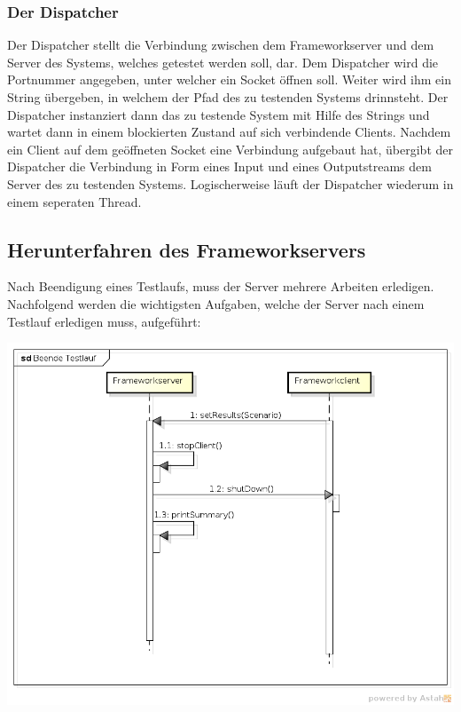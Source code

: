 \subsubsection{Der Dispatcher}
\label{sec:dispatcher}

Der Dispatcher stellt die Verbindung zwischen dem Frameworkserver und dem Server des Systems, welches getestet werden soll, dar. Dem Dispatcher wird die Portnummer angegeben, unter welcher ein Socket öffnen soll. Weiter wird ihm ein String übergeben, in welchem der Pfad des zu testenden Systems drinnsteht. Der Dispatcher instanziert dann das zu testende System mit Hilfe des Strings und wartet dann in einem blockierten Zustand auf sich verbindende Clients. Nachdem ein Client auf dem geöffneten Socket eine Verbindung aufgebaut hat, übergibt der Dispatcher die Verbindung in Form eines Input und eines Outputstreams dem Server des zu testenden Systems.\newline
Logischerweise läuft der Dispatcher wiederum in einem seperaten Thread.

\subsection{Herunterfahren des Frameworkservers}
\label{sec:herunterfahrenFramework}

Nach Beendigung eines Testlaufs, muss der Server mehrere Arbeiten erledigen. Nachfolgend werden die wichtigsten Aufgaben, welche der Server nach einem Testlauf erledigen muss, aufgeführt:

\begin{center}
\includegraphics[scale=0.2]{image_testFramework/BeendeTestlauf.png}
\end{center}


